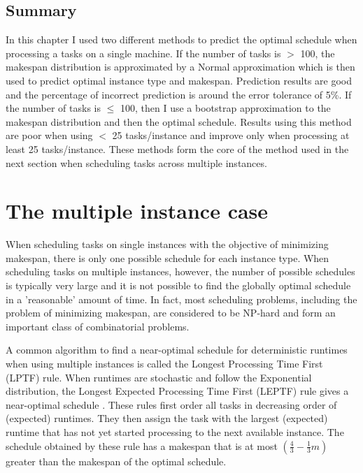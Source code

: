 \documentclass[12pt]{report}
\begin{document}
\section{Summary}
In this chapter I used two different methods to predict the optimal schedule when processing a tasks on a single machine. 
If the number of tasks is $>$ 100, the makespan distribution is approximated by a Normal approximation which is then used to predict optimal instance type and makespan. 
Prediction results are good and the percentage of incorrect prediction is around the error tolerance of 5\%. 
If the number of tasks is $\leq$ 100, then I use a bootstrap approximation to the makespan distribution and then the optimal schedule. 
Results using this method are poor when using $<$ 25 tasks/instance and improve only when processing at least 25 tasks/instance.
These methods form the core of the method used in the next section when scheduling tasks across multiple instances.

\chapter{The multiple instance case}

When scheduling tasks on single instances with the objective of minimizing makespan, there is only one possible schedule for each instance type.
When scheduling tasks on multiple instances, however, the number of possible schedules is typically very large and it is not possible to find the globally optimal schedule in a 'reasonable' amount of time.
In fact, most scheduling problems, including the problem of minimizing makespan, are considered to be NP-hard \cite{Garey1979} and form an important class of combinatorial problems.

A common algorithm to find a near-optimal schedule for deterministic runtimes when using multiple instances is called the Longest Processing Time First (LPTF) rule.
When runtimes are stochastic and follow the Exponential distribution, the Longest Expected Processing Time First (LEPTF) rule gives a near-optimal schedule \cite{Pinedo2012}. 
These rules first order all tasks in decreasing order of (expected) runtimes.
They then assign the task with the largest (expected) runtime that has not yet started processing to the next available instance. 
The schedule obtained by these rule has a makespan that is at most $\left(\frac{4}{3} - \frac{1}{3}m \right)$ greater than the makespan of the optimal schedule.
\end{document}

